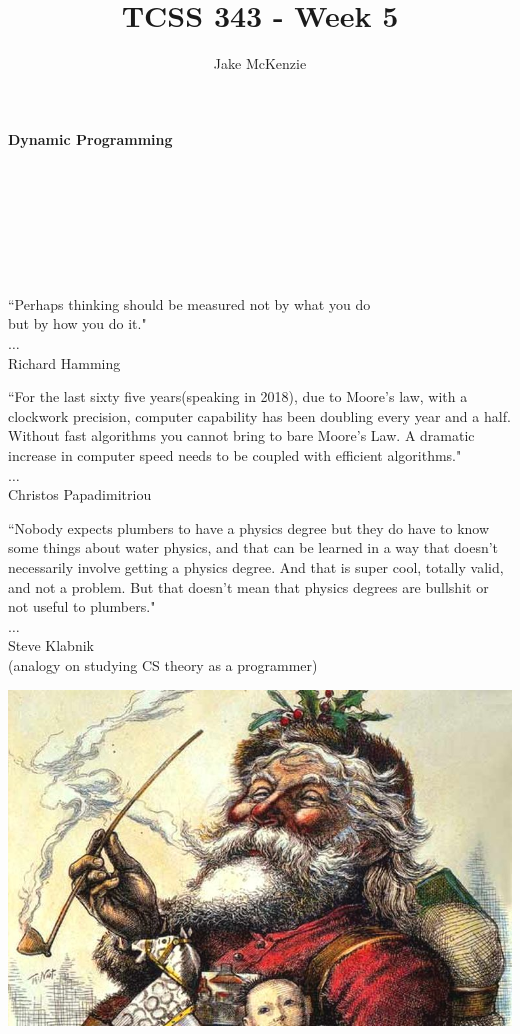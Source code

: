 \documentclass[12pt]{article}
\begin{document}
\title{TCSS 343 - Week 5}
\author{Jake McKenzie}
\maketitle
\noindent\centerline{\textbf{Dynamic Programming}}\\\\\\\\\\\\
\begin{center}
    ``Perhaps thinking should be measured not by what you do \\but by how you do it." \\$\dots$\\ Richard Hamming
\end{center}
\begin{center}
    ``For the last sixty five years(speaking in 2018), due to Moore's law, with a clockwork precision, computer capability has been doubling every year and a half. Without fast algorithms you cannot bring to bare Moore's Law. A dramatic increase in computer speed needs to be coupled with efficient algorithms." \\$\dots$\\ Christos Papadimitriou
\end{center}
\begin{center}
    ``Nobody expects plumbers to have a physics degree but they do have to know some things about water physics, and that can be learned in a way that doesn’t necessarily involve getting a physics degree. And that is super cool, totally valid, and not a problem. But that doesn’t mean that physics degrees are bullshit or not useful to plumbers." \\$\dots$\\ Steve Klabnik \\(analogy on studying CS theory as a programmer)
\end{center}
\newpage
\noindent\includegraphics[scale = .3]{santa.jpg}\\
\end{document}
